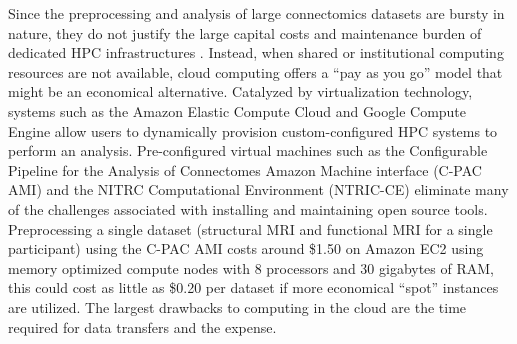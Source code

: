 \documentclass{bmcart}
\begin{document}
Since the preprocessing and analysis of large connectomics datasets are bursty in nature, they do not justify the large capital costs and maintenance burden of dedicated HPC infrastructures \cite{ODriscoll2013}. Instead, when shared or institutional computing resources are not available, cloud computing offers a ``pay as you go'' model that might be an economical alternative. Catalyzed by virtualization technology, systems such as the Amazon Elastic Compute Cloud and Google Compute Engine allow users to dynamically provision custom-configured HPC systems to perform an analysis. Pre-configured virtual machines such as the Configurable Pipeline for the Analysis of Connectomes Amazon Machine interface (C-PAC AMI) \cite{CPAC_AMI2014}  and the NITRC Computational Environment (NTRIC-CE) \cite{NITRC_CE2014} eliminate many of the challenges associated with installing and maintaining open source tools.  Preprocessing a single dataset (structural MRI and functional MRI for a single participant) using the C-PAC AMI costs around \$1.50 on Amazon EC2 using memory optimized compute nodes with 8 processors and 30 gigabytes of RAM, this could cost as little as \$0.20 per dataset if more economical ``spot'' instances are utilized. The largest drawbacks to computing in the cloud are the time required for data transfers and the expense.
\end{document}
